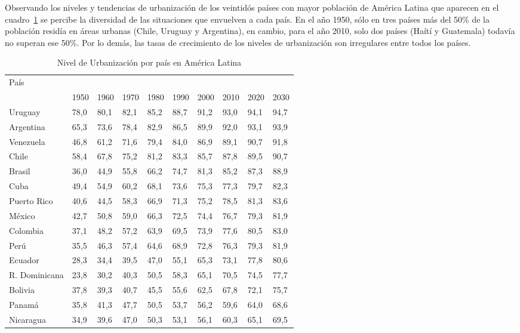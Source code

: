 Observando los niveles y tendencias de urbanización de los veintidós países con mayor población de
América Latina que aparecen en el cuadro~\ref{porpais} se percibe la diversidad de las
situaciones  que envuelven a cada país. En el año 1950, sólo en tres países más del 50\% de la
población residía en áreas urbanas (Chile, Uruguay y Argentina), en cambio, para el año 2010, solo
dos países (Haítí y Guatemala) todavía no superan ese 50\%. Por lo demás, las tasas de crecimiento
de los niveles de urbanización son irregulares entre todos los países.

\begin{table}
  \centering
  \caption{Nivel de Urbanización por país en América Latina}
  \label{porpais}
  \begin{tabular}{|llllllllll|}
  \hline
  País & & & & & & & & & \\
  & 1950& 1960& 1970& 1980& 1990& 2000& 2010& 2020& 2030 \\
  \hline
  Uruguay &78,0 &80,1 &82,1 &85,2 &88,7 &91,2 &93,0 &94,1 &94,7\\ 
  Argentina &65,3 &73,6 &78,4 &82,9 &86,5 &89,9 &92,0 &93,1 &93,9\\ 
  Venezuela &46,8 &61,2 &71,6 &79,4 &84,0 &86,9 &89,1 &90,7 &91,8\\ 
  Chile &58,4 &67,8 &75,2 &81,2 &83,3 &85,7 &87,8 &89,5 &90,7\\ 
  Brasil &36,0 &44,9 &55,8 &66,2 &74,7 &81,3& 85,2 &87,3 &88,9\\ 
  Cuba &49,4 &54,9 &60,2 &68,1 &73,6 &75,3 &77,3 &79,7 &82,3\\ 
  Puerto Rico &40,6 &44,5 &58,3 &66,9 &71,3 &75,2 &78,5 &81,3 &83,6\\ 
  México &42,7 &50,8 &59,0 &66,3 &72,5 &74,4 &76,7 &79,3 &81,9\\ 
  Colombia &37,1 &48,2 &57,2 &63,9 &69,5 &73,9 &77,6 &80,5 &83,0\\ 
  Perú &35,5 &46,3 &57,4 &64,6 &68,9 &72,8 &76,3 &79,3 &81,9\\ 
  Ecuador &28,3 &34,4 &39,5 &47,0 &55,1 &65,3 &73,1 &77,8 &80,6\\ 
  R. Dominicana &23,8 &30,2 &40,3 &50,5 &58,3 &65,1 &70,5 &74,5 &77,7\\ 
  Bolivia &37,8 &39,3 &40,7 &45,5 &55,6 &62,5 &67,8 &72,1 &75,7\\ 
  Panamá &35,8 &41,3 &47,7 &50,5 &53,7 &56,2 &59,6 &64,0 &68,6\\ 
  Nicaragua &34,9 &39,6 &47,0 &50,3 &53,1 &56,1 &60,3 &65,1 &69,5\\ 

\end{tabular}
\end{table}
